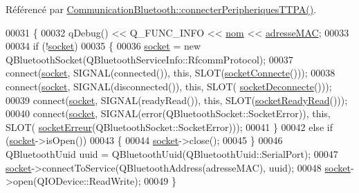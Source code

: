 Référencé par \hyperlink{class_communication_bluetooth_a321073d9dc26aad4b34ecf41a1dee8a4}{Communication\+Bluetooth\+::connecter\+Peripheriques\+T\+T\+P\+A()}.


\begin{DoxyCode}
00031 \{
00032     qDebug() << Q\_FUNC\_INFO << \hyperlink{class_peripherique_t_t_p_a_afafe3566b4b5357819811218b9a4244f}{nom} << \hyperlink{class_peripherique_t_t_p_a_a444063230c83cf81eff8a3a55736f2cf}{adresseMAC};
00033 
00034     \textcolor{keywordflow}{if} (!\hyperlink{class_peripherique_t_t_p_a_ab66f30984a7f9fa17fd28391efe968a9}{socket})
00035     \{
00036         \hyperlink{class_peripherique_t_t_p_a_ab66f30984a7f9fa17fd28391efe968a9}{socket} = \textcolor{keyword}{new} QBluetoothSocket(QBluetoothServiceInfo::RfcommProtocol);
00037         connect(\hyperlink{class_peripherique_t_t_p_a_ab66f30984a7f9fa17fd28391efe968a9}{socket}, SIGNAL(connected()), \textcolor{keyword}{this}, SLOT(\hyperlink{class_peripherique_t_t_p_a_aab23a43f5c9d70c30df3dbf4aeeeff9d}{socketConnecte}()));
00038         connect(\hyperlink{class_peripherique_t_t_p_a_ab66f30984a7f9fa17fd28391efe968a9}{socket}, SIGNAL(disconnected()), \textcolor{keyword}{this}, SLOT(
      \hyperlink{class_peripherique_t_t_p_a_adb04c45864ea56a80a0716cde0a31856}{socketDeconnecte}()));
00039         connect(\hyperlink{class_peripherique_t_t_p_a_ab66f30984a7f9fa17fd28391efe968a9}{socket}, SIGNAL(readyRead()), \textcolor{keyword}{this}, SLOT(\hyperlink{class_peripherique_t_t_p_a_a4e1d676e59b293161a40ee6428a79871}{socketReadyRead}()));
00040         connect(\hyperlink{class_peripherique_t_t_p_a_ab66f30984a7f9fa17fd28391efe968a9}{socket}, SIGNAL(error(QBluetoothSocket::SocketError)), \textcolor{keyword}{this}, SLOT(
      \hyperlink{class_peripherique_t_t_p_a_a85811ace874ff7cea3437146511f1b2c}{socketErreur}(QBluetoothSocket::SocketError)));
00041     \}
00042     \textcolor{keywordflow}{else} \textcolor{keywordflow}{if} (\hyperlink{class_peripherique_t_t_p_a_ab66f30984a7f9fa17fd28391efe968a9}{socket}->isOpen())
00043     \{
00044         \hyperlink{class_peripherique_t_t_p_a_ab66f30984a7f9fa17fd28391efe968a9}{socket}->close();
00045     \}
00046     QBluetoothUuid uuid = QBluetoothUuid(QBluetoothUuid::SerialPort);
00047     \hyperlink{class_peripherique_t_t_p_a_ab66f30984a7f9fa17fd28391efe968a9}{socket}->connectToService(QBluetoothAddress(adresseMAC), uuid);
00048     \hyperlink{class_peripherique_t_t_p_a_ab66f30984a7f9fa17fd28391efe968a9}{socket}->open(QIODevice::ReadWrite);
00049 \}
\end{DoxyCode}
\mbox{\label{class_peripherique_t_t_p_a_a8cb56776db43953cceb04e5f3ee4ca7b}} 
